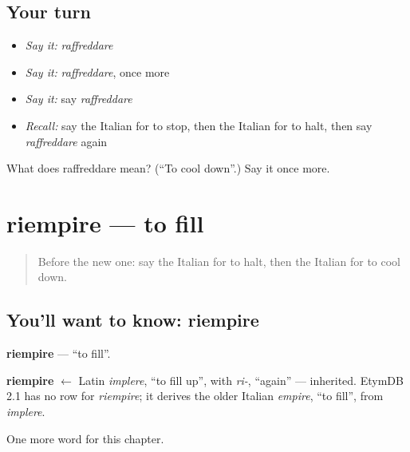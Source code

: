 \subsection*{Your turn}
\begin{itemize}
\raggedright
  \item \emph{Say it:} \emph{raffreddare}
  \item \emph{Say it:} \emph{raffreddare}, once more
  \item \emph{Say it:} say \emph{raffreddare}
  \item \emph{Recall:} say the Italian for to stop, then the Italian for to halt, then say \emph{raffreddare} again
\end{itemize}

\begin{tcolorbox}[breakable,colback=teal!4,colframe=teal!35!black,title={Before you move on}]
What does raffreddare mean? (\textquotedblleft{}To cool down\textquotedblright{}.) Say it once more.
\end{tcolorbox}
\section[riempire]{riempire — to fill}

\label{lesson:IT-C206-riempire}



\begin{quote}
Before the new one: say the Italian for to halt, then the Italian for to cool down.
\end{quote}

\subsection*{You'll want to know: riempire}
\textbf{riempire} — \textquotedblleft{}to fill\textquotedblright{}.

\begin{cousinweb}
\textbf{riempire} $\leftarrow$ Latin \emph{implere}, \textquotedblleft{}to fill up\textquotedblright{}, with \emph{ri-}, \textquotedblleft{}again\textquotedblright{} — inherited. EtymDB 2.1 has no row for \emph{riempire}; it derives the older Italian \emph{empire}, \textquotedblleft{}to fill\textquotedblright{}, from \emph{implere}.
\end{cousinweb}

\begin{grammarlens}[title={What you've built}]
One more word for this chapter.
\end{grammarlens}

